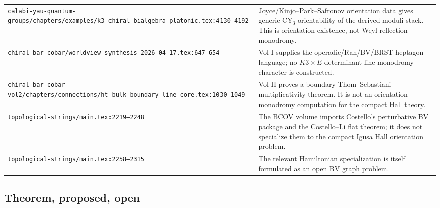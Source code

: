 \begin{center}
\begin{tabular}{p{}p{}}
\texttt{calabi-yau-quantum-groups/chapters/examples/k3\_chiral\_bialgebra\_platonic.tex:4130--4192} &
Joyce/Kinjo--Park--Safronov orientation data gives generic CY\(_3\)
orientability of the derived moduli stack.  This is orientation
existence, not Weyl reflection monodromy. \\
\texttt{chiral-bar-cobar/worldview\_synthesis\_2026\_04\_17.tex:647--654} &
Vol I supplies the operadic/Ran/BV/BRST heptagon language; no
\(K3\times E\) determinant-line monodromy character is constructed. \\
\texttt{chiral-bar-cobar-vol2/chapters/connections/ht\_bulk\_boundary\_line\_core.tex:1030--1049} &
Vol II proves a boundary Thom--Sebastiani multiplicativity theorem.  It
is not an orientation monodromy computation for the compact Hall theory. \\
\texttt{topological-strings/main.tex:2219--2248} &
The BCOV volume imports Costello's perturbative BV package and the
Costello--Li flat theorem; it does not specialize them to the compact
Igusa Hall orientation problem. \\
\texttt{topological-strings/main.tex:2258--2315} &
The relevant Hamiltonian specialization is itself formulated as an open
BV graph problem. \\
\hline
\end{tabular}
\end{center}

\subsection{Theorem, proposed, open}

